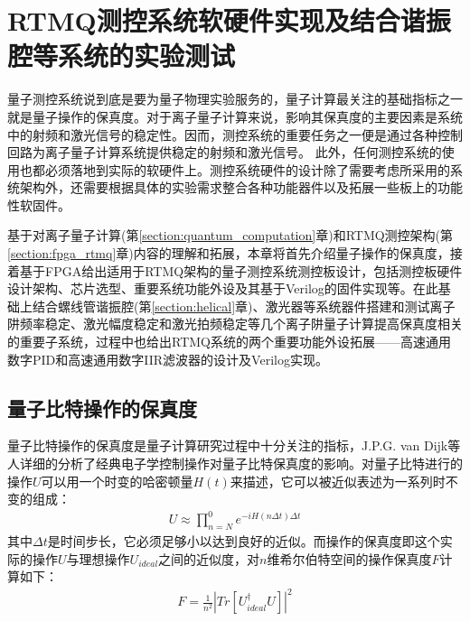 

\chapter[RTMQ测控系统软硬件实现及结合谐振腔等系统的实验测试]{RTMQ测控系统软硬件实现及结合谐振腔等系统的实验测试\label{section:implementation}}

量子测控系统说到底是要为量子物理实验服务的，量子计算最关注的基础指标之一就是量子操作的保真度。对于离子量子计算来说，影响其保真度的主要因素是系统中的射频和激光信号的稳定性。因而，测控系统的重要任务之一便是通过各种控制回路为离子量子计算系统提供稳定的射频和激光信号。
此外，任何测控系统的使用也都必须落地到实际的软硬件上。测控系统硬件的设计除了需要考虑所采用的系统架构外，还需要根据具体的实验需求整合各种功能器件以及拓展一些板上的功能性软固件。

基于对离子量子计算(第\ref{section:quantum_computation}章)和RTMQ测控架构(第\ref{section:fpga_rtmq}章)内容的理解和拓展，本章将首先介绍量子操作的保真度，接着基于FPGA给出适用于RTMQ架构的量子测控系统测控板设计，包括测控板硬件设计架构、芯片选型、重要系统功能外设及其基于Verilog的固件实现等。在此基础上结合螺线管谐振腔(第\ref{section:helical}章)、激光器等系统器件搭建和测试离子阱频率稳定、激光幅度稳定和激光拍频稳定等几个离子阱量子计算提高保真度相关的重要子系统，过程中也给出RTMQ系统的两个重要功能外设拓展——高速通用数字PID和高速通用数字IIR滤波器的设计及Verilog实现。






\section[量子比特操作的保真度]{量子比特操作的保真度}


量子比特操作的保真度是量子计算研究过程中十分关注的指标，J.P.G. van Dijk等人\cite[]{van_Dijk_Kawakami_Schouten_Veldhorst_Vandersypen_Babaie_Charbon_Sebastiano_2019}详细的分析了经典电子学控制操作对量子比特保真度的影响。对量子比特进行的操作$U$可以用一个时变的哈密顿量$H(t)$来描述，它可以被近似表述为一系列时不变的组成：
\begin{align}
    U\approx \prod_{n=N}^{0} e^{-iH(n\Delta t)\Delta t}
\end{align}
其中$\Delta t$是时间步长，它必须足够小以达到良好的近似。而操作的保真度即这个实际的操作$U$与理想操作$U_{ideal}$之间的近似度，对$n$维希尔伯特空间的操作保真度$F$计算如下：
\begin{align}
    F=\frac{1}{n^2}\left|Tr\left[U_{ideal}^{\dagger}U\right]\right|^2
\end{align}

